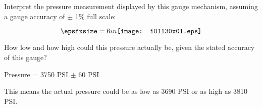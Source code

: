

Interpret the pressure measurement displayed by this gauge mechanism, assuming a gauge accuracy of $\pm$ 1\% full scale:

$$\epsfxsize=6in \texttt{[image: i01130x01.eps]}$$

How low and how high could this pressure actually be, given the stated accuracy of this gauge?







Pressure = 3750 PSI $\pm$ 60 PSI
 
\vskip 10pt

This means the actual pressure could be as low as 3690 PSI or as high as 3810 PSI.











